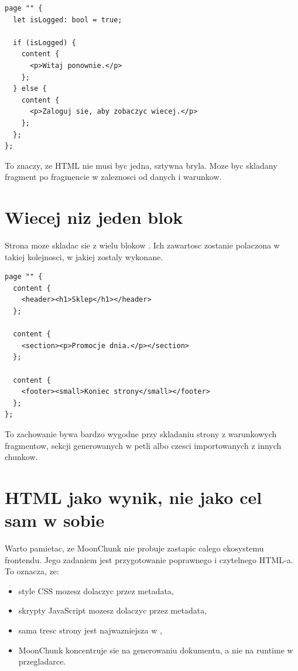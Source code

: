 \begin{lstlisting}[style=moonchunk,caption={Content budowany warunkowo}]
page "" {
  let isLogged: bool = true;

  if (isLogged) {
    content {
      <p>Witaj ponownie.</p>
    };
  } else {
    content {
      <p>Zaloguj sie, aby zobaczyc wiecej.</p>
    };
  };
};
\end{lstlisting}

To znaczy, ze HTML nie musi byc jedna, sztywna bryla. Moze byc skladany fragment po
fragmencie w zaleznosci od danych i warunkow.

\section{Wiecej niz jeden blok }
Strona moze skladac sie z wielu blokow . Ich zawartosc zostanie polaczona
w takiej kolejnosci, w jakiej zostaly wykonane.

\begin{lstlisting}[style=moonchunk,caption={Kilka blokow content na jednej stronie}]
page "" {
  content {
    <header><h1>Sklep</h1></header>
  };

  content {
    <section><p>Promocje dnia.</p></section>
  };

  content {
    <footer><small>Koniec strony</small></footer>
  };
};
\end{lstlisting}

To zachowanie bywa bardzo wygodne przy skladaniu strony z warunkowych fragmentow,
sekcji generowanych w petli albo czesci importowanych z innych chunkow.

\section{HTML jako wynik, nie jako cel sam w sobie}
Warto pamietac, ze MoonChunk nie probuje zastapic calego ekosystemu frontendu.
Jego zadaniem jest przygotowanie poprawnego i czytelnego HTML-a. To oznacza, ze:

\begin{itemize}
  \item style CSS mozesz dolaczyc przez metadata,
  \item skrypty JavaScript mozesz dolaczyc przez metadata,
  \item sama tresc strony jest najwazniejsza w ,
  \item MoonChunk koncentruje sie na generowaniu dokumentu, a nie na runtime w przegladarce.
\end{itemize}

